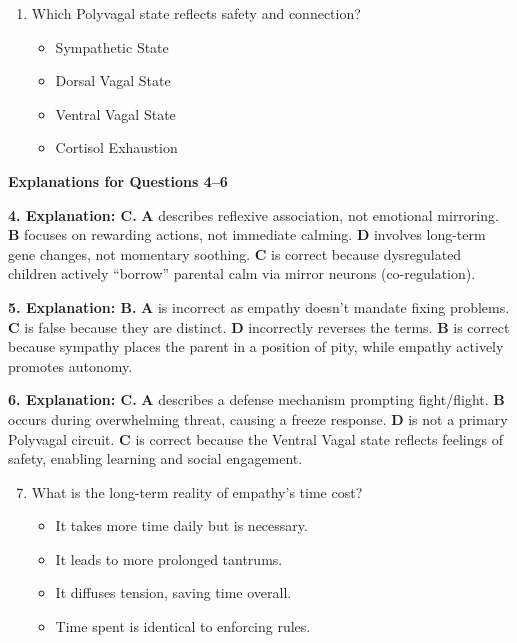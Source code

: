 \begin{practiceexercise}
\begin{enumerate}
    \item Which Polyvagal state reflects safety and connection?
    \begin{itemize}
        \item[A.] Sympathetic State
        \item[B.] Dorsal Vagal State
        \item[C.] Ventral Vagal State
        \item[D.] Cortisol Exhaustion
    \end{itemize}
\end{enumerate}
\vspace{\fill}
\newpage

\textbf{Explanations for Questions 4--6}

\vspace{0.5cm}
\textbf{4. Explanation: C.} \textbf{A} describes reflexive association, not emotional mirroring. \textbf{B} focuses on rewarding actions, not immediate calming. \textbf{D} involves long-term gene changes, not momentary soothing. \textbf{C} is correct because dysregulated children actively ``borrow'' parental calm via mirror neurons (co-regulation).
\vspace{\fill}

\textbf{5. Explanation: B.} \textbf{A} is incorrect as empathy doesn't mandate fixing problems. \textbf{C} is false because they are distinct. \textbf{D} incorrectly reverses the terms. \textbf{B} is correct because sympathy places the parent in a position of pity, while empathy actively promotes autonomy.
\vspace{\fill}

\textbf{6. Explanation: C.} \textbf{A} describes a defense mechanism prompting fight/flight. \textbf{B} occurs during overwhelming threat, causing a freeze response. \textbf{D} is not a primary Polyvagal circuit. \textbf{C} is correct because the Ventral Vagal state reflects feelings of safety, enabling learning and social engagement.
\vspace{\fill}
\newpage

\begin{enumerate}
    \setcounter{enumi}{6}
    \item What is the long-term reality of empathy's time cost?
    \begin{itemize}
        \item[A.] It takes more time daily but is necessary.
        \item[B.] It leads to more prolonged tantrums.
        \item[C.] It diffuses tension, saving time overall.
        \item[D.] Time spent is identical to enforcing rules.
    \end{itemize}
    \vspace{\fill}


\end{enumerate}
\end{practiceexercise}
